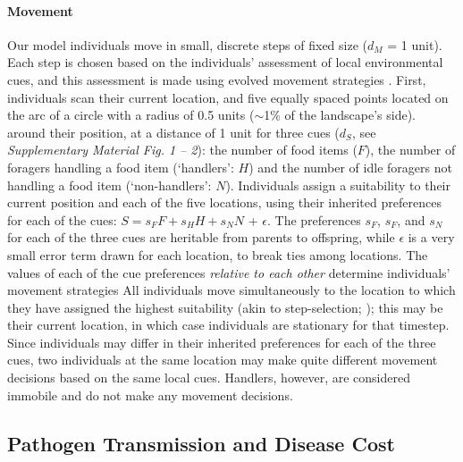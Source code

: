\paragraph*{Movement} Our model individuals move in small, discrete steps of fixed size ($d_M$ = 1 unit).
Each step is chosen based on the individuals' assessment of local environmental cues, and this assessment is made using evolved movement strategies \citep[as in][]{netz2021a,gupte2021a}.
First, individuals scan their current location, and five equally spaced points located on the arc of a circle with a radius of 0.5 units ($\sim$1\% of the landscape's side).
around their position, at a distance of 1 unit for three cues ($d_S$, see \textit{Supplementary Material Fig. 1 -- 2}): the number of food items ($F$), the number of foragers handling a food item (`handlers': $H$) and the number of idle foragers not handling a food item (`non-handlers': $N$).
Individuals assign a suitability \citep[see][]{netz2021a,gupte2021a} to their current position and each of the five locations, using their inherited preferences for each of the cues: $S = s_FF + s_HH + s_NN$ + $\epsilon$.
The preferences $s_F$, $s_F$, and $s_N$ for each of the three cues are heritable from parents to offspring, while $\epsilon$ is a very small error term drawn for each location, to break ties among locations.
The values of each of the cue preferences \emph{relative to each other} determine individuals' movement strategies \citep{gupte2021a}
All individuals move simultaneously to the location to which they have assigned the highest suitability (akin to step-selection; \citealp{avgar2016}); this may be their current location, in which case individuals are stationary for that timestep.
Since individuals may differ in their inherited preferences for each of the three cues, two individuals at the same location may make quite different movement decisions based on the same local cues.
Handlers, however, are considered immobile and do not make any movement decisions.

\subsection*{Pathogen Transmission and Disease Cost}

